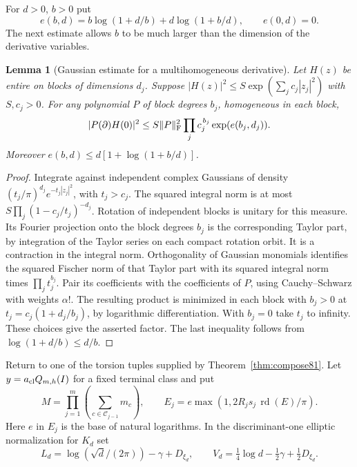 \documentclass[a4paper,11pt]{article}
\newtheorem{lemma}[proposition]{Lemma}
\theoremstyle{definition}
\theoremstyle{remark}
\numberwithin{equation}{section}
\begin{document}
For \(d>0\), \(b>0\) put
\[
 e(b,d)=b\log(1+d/b)+d\log(1+b/d),\qquad e(0,d)=0.
\]
The next estimate allows \(b\) to be much larger than the
dimension of the derivative variables.

\begin{lemma}[Gaussian estimate for a multihomogeneous derivative]
\label{lem:opt83}
Let \(H(z)\) be entire on blocks of dimensions \(d_j\). Suppose
\(|H(z)|^2\le S\exp(\sum_j c_j|z_j|^2)\) with \(S,c_j>0\).
For any polynomial \(P\) of block degrees \(b_j\), homogeneous in
each block,
\[
 |P(\partial)H(0)|^2
   \le S\|P\|_{\rm F}^2
             \prod_j c_j^{\,b_j}\exp(e(b_j,d_j)).
\]
Moreover \(e(b,d)\le d[1+\log(1+b/d)]\).
\end{lemma}
\begin{proof}
Integrate against independent complex Gaussians of density
\((t_j/\pi)^{d_j}e^{-t_j|z_j|^2}\), with \(t_j>c_j\).
The squared integral norm is at most
\(S\prod_j(1-c_j/t_j)^{-d_j}\). Rotation of independent blocks
is unitary for this measure. Its Fourier projection onto the block
degrees \(b_j\) is the corresponding Taylor part, by integration
of the Taylor series on each compact rotation orbit. It is a
contraction in the integral norm. Orthogonality of Gaussian
monomials identifies the squared Fischer norm of that Taylor part
with its squared integral norm times \(\prod_j t_j^{b_j}\).
Pair its coefficients with the coefficients of \(P\), using
Cauchy--Schwarz with weights \(\alpha!\). The resulting product
is minimized in each block with \(b_j>0\) at
\(t_j=c_j(1+d_j/b_j)\), by logarithmic differentiation.
With \(b_j=0\) take \(t_j\) to infinity. These choices give
the asserted factor. The last inequality follows from
\(\log(1+d/b)\le d/b\).
\end{proof}

Return to one of the torsion tuples supplied by
Theorem~\ref{thm:compose81}. Let \(y=a_{\rm cl}Q_{m,h}(I)\) for
a fixed terminal class and put
\[
 M=\prod_{j=1}^m\left(\sum_{c\in\mathcal C_{j-1}}m_c\right),
 \qquad E_j=e\max(1,2R_js_j\,\operatorname{rd}(E)/\pi).
\]
Here \(e\) in \(E_j\) is the base of natural logarithms. In the
discriminant-one elliptic normalization for \(K_d\) set
\[
 L_d=\log(\sqrt d/(2\pi))-\gamma+D_{\xi_d},
 \qquad V_d=\tfrac14\log d-\tfrac12\gamma+\tfrac12D_{\xi_d}.
\]
\end{document}
